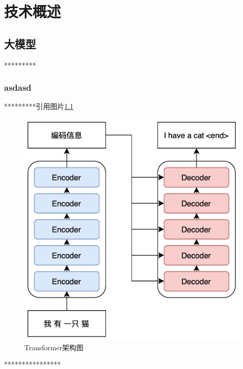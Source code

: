 
\chapter{技术概述}

\section{大模型}
*********
\subsection{asdasd}
*********引用图片\ref{fig:transformer}\parencite[postnote]{bibid}
\begin{figure}[htbp]
	\vspace{13pt} %
	\centering
	\includegraphics[]{images/Transformer.png}
	\caption{Transformer架构图}\label{fig:transformer} %
\end{figure}

****************
